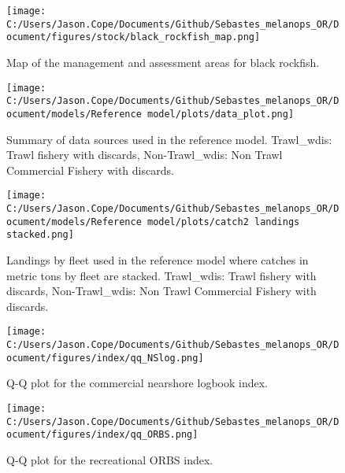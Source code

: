 \documentclass[11pt,
  letterpaper,
]{article}
\begin{document}
\begin{figure}
{\centering
\texttt{[image: C:/Users/Jason.Cope/Documents/Github/Sebastes\_melanops\_OR/Document/figures/stock/black\_rockfish\_map.png]}
}
\caption{Map of the management and assessment areas for black rockfish.\label{fig:map}}
\end{figure}

\newpage

\begin{figure}
{\centering
\texttt{[image: C:/Users/Jason.Cope/Documents/Github/Sebastes\_melanops\_OR/Document/models/Reference model/plots/data\_plot.png]}
}
\caption{Summary of data sources used in the reference model.  Trawl\_wdis: Trawl fishery with discards, Non-Trawl\_wdis: Non Trawl Commercial Fishery with discards.\label{fig:data-plot}}
\end{figure}

\newpage

\begin{figure}
{\centering
\texttt{[image: C:/Users/Jason.Cope/Documents/Github/Sebastes\_melanops\_OR/Document/models/Reference model/plots/catch2 landings stacked.png]}
}
\caption{Landings by fleet used in the reference model where catches in metric tons by fleet are stacked. Trawl\_wdis: Trawl fishery with discards, Non-Trawl\_wdis: Non Trawl Commercial Fishery with discards.\label{fig:catch}}
\end{figure}

\newpage

\begin{figure}
{\centering
\texttt{[image: C:/Users/Jason.Cope/Documents/Github/Sebastes\_melanops\_OR/Document/figures/index/qq\_NSlog.png]}
}
\caption{Q-Q plot for the commercial nearshore logbook index.\label{fig:qq_NSlog}}
\end{figure}

\newpage

\begin{figure}
{\centering
\texttt{[image: C:/Users/Jason.Cope/Documents/Github/Sebastes\_melanops\_OR/Document/figures/index/qq\_ORBS.png]}
}
\caption{Q-Q plot for the recreational ORBS index.\label{fig:qq_ORBS}}
\end{figure}
\end{document}
